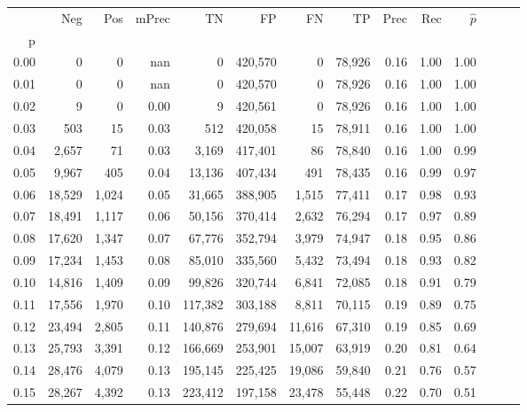 \begin{tabular}{rrrrrrrrrrrrrr}
\toprule
{} &     Neg &    Pos & mPrec &       TN &       FP &      FN &      TP &  Prec &   Rec & $\hat{p}$ \\
p    &         &        &       &          &          &         &         &       &       &           \\
\midrule
0.00 &       0 &      0 &   nan &        0 &  420,570 &       0 &  78,926 &  0.16 &  1.00 &      1.00 \\
0.01 &       0 &      0 &   nan &        0 &  420,570 &       0 &  78,926 &  0.16 &  1.00 &      1.00 \\
0.02 &       9 &      0 &  0.00 &        9 &  420,561 &       0 &  78,926 &  0.16 &  1.00 &      1.00 \\
0.03 &     503 &     15 &  0.03 &      512 &  420,058 &      15 &  78,911 &  0.16 &  1.00 &      1.00 \\
0.04 &   2,657 &     71 &  0.03 &    3,169 &  417,401 &      86 &  78,840 &  0.16 &  1.00 &      0.99 \\
0.05 &   9,967 &    405 &  0.04 &   13,136 &  407,434 &     491 &  78,435 &  0.16 &  0.99 &      0.97 \\
0.06 &  18,529 &  1,024 &  0.05 &   31,665 &  388,905 &   1,515 &  77,411 &  0.17 &  0.98 &      0.93 \\
0.07 &  18,491 &  1,117 &  0.06 &   50,156 &  370,414 &   2,632 &  76,294 &  0.17 &  0.97 &      0.89 \\
0.08 &  17,620 &  1,347 &  0.07 &   67,776 &  352,794 &   3,979 &  74,947 &  0.18 &  0.95 &      0.86 \\
0.09 &  17,234 &  1,453 &  0.08 &   85,010 &  335,560 &   5,432 &  73,494 &  0.18 &  0.93 &      0.82 \\
0.10 &  14,816 &  1,409 &  0.09 &   99,826 &  320,744 &   6,841 &  72,085 &  0.18 &  0.91 &      0.79 \\
0.11 &  17,556 &  1,970 &  0.10 &  117,382 &  303,188 &   8,811 &  70,115 &  0.19 &  0.89 &      0.75 \\
0.12 &  23,494 &  2,805 &  0.11 &  140,876 &  279,694 &  11,616 &  67,310 &  0.19 &  0.85 &      0.69 \\
0.13 &  25,793 &  3,391 &  0.12 &  166,669 &  253,901 &  15,007 &  63,919 &  0.20 &  0.81 &      0.64 \\
0.14 &  28,476 &  4,079 &  0.13 &  195,145 &  225,425 &  19,086 &  59,840 &  0.21 &  0.76 &      0.57 \\
0.15 &  28,267 &  4,392 &  0.13 &  223,412 &  197,158 &  23,478 &  55,448 &  0.22 &  0.70 &      0.51 \\

\end{tabular}
